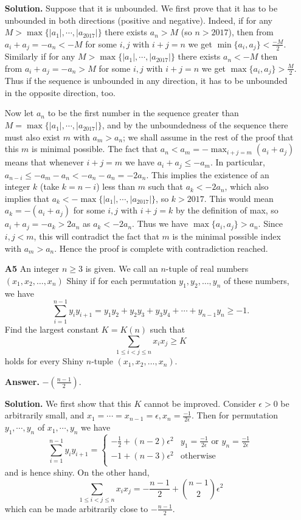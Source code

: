 \documentclass[11pt,a4paper]{article}
\begin{document}
\begin{enumerate}
	\textbf{Solution.} Suppose that it is unbounded. We first prove that it has to be unbounded in both directions (positive and negative). Indeed, if for any $M>\max\{|a_1|, \cdots , |a_{2017}|\}$ there exists $a_n>M$ (so $n>2017$), then from $a_i+a_j=-a_n<-M$ for some $i, j$ with $i+j=n$ we get $\min\{a_i, a_j\}<\frac{-M}{2}$. Similarly if for any $M>\max\{|a_1|, \cdots , |a_{2017}|\}$ there exists $a_n<-M$ then from $a_i+a_j=-a_n>M$ for some $i, j$ with $i+j=n$ we get $\max\{a_i, a_j\}>\frac{M}{2}$. Thus if the sequence is unbounded in any direction, it has to be unbounded in the opposite direction, too. 
	
	Now let $a_n$ to be the first number in the sequence greater than $M=\max\{|a_1|, \cdots , |a_{2017}|\}$, and by the unboundedness of the sequence there must also exist $m$ with $a_m>a_n$; we shall assume in the rest of the proof that this $m$ is minimal possible. The fact that $a_n<a_m=-\max_{i+j=m} (a_i+a_j)$ means that whenever $i+j=m$ we have $a_i+a_j\le -a_m$. In particular, $a_{n-i}\le -a_m-a_n<-a_n-a_n = -2a_n$. This implies the existence of an integer $k$ (take $k=n-i$) less than $m$ such that $a_{k}<-2a_n$, which also implies that $a_k<-\max\{|a_1|, \cdots , |a_{2017}|\}$, so $k>2017$. This would mean $a_k=-(a_i+a_j)$ for some $i, j$ with $i+j=k$ by the definition of max, so $a_i+a_j=-a_k>2a_n$ as $a_k<-2a_n$. Thus we have $\max\{a_i, a_j\}>a_n$. Since $i, j<m$, this will contradict the fact that $m$ is the minimal possible index with $a_m>a_n$. Hence the proof is complete with contradiction reached. 
	
	\item[\textbf{A5}]
	An integer $n \geq 3$ is given. We call an $n$-tuple of real numbers $(x_1, x_2, \dots, x_n)$ Shiny if for each permutation $y_1, y_2, \dots, y_n$ of these numbers, we have
	$$\sum \limits_{i=1}^{n-1} y_i y_{i+1} = y_1y_2 + y_2y_3 + y_3y_4 + \cdots + y_{n-1}y_n \geq -1.$$Find the largest constant $K = K(n)$ such that
	$$\sum \limits_{1 \leq i < j \leq n} x_i x_j \geq K$$holds for every Shiny $n$-tuple $(x_1, x_2, \dots, x_n)$.	
	
	\textbf{Answer.} $-(\frac{n-1}{2})$. 
	
	\textbf{Solution.} 
	We first show that this $K$ cannot be improved. 
	Consider $\epsilon>0$ be arbitrarily small, 
	and $x_1=\cdots = x_{n-1}=\epsilon, x_{n}=\frac{-1}{2\epsilon}$. 
	Then for permutation $y_1, \cdots, y_n$ of $x_1, \cdots, y_n$ we have 
	\[
	\sum \limits_{i=1}^{n-1} y_i y_{i+1} = 
	\begin{cases}
	  -\frac 12 + (n-2)\epsilon^2 & y_1=\frac{-1}{2\epsilon}\text{ or }y_n=\frac{-1}{2\epsilon}\\
	  -1+(n-3)\epsilon^2 & \text{otherwise}\\
	\end{cases}
	\]
	and is hence shiny. 
	On the other hand, 
	\[
	\sum \limits_{1 \leq i < j \leq n} x_i x_j 
	=-\frac{n-1}{2} + \binom{n-1}{2}\epsilon^2
	\]
	which can be made arbitrarily close to $-\frac{n-1}{2}$. 
	

\end{enumerate}
\end{document}
